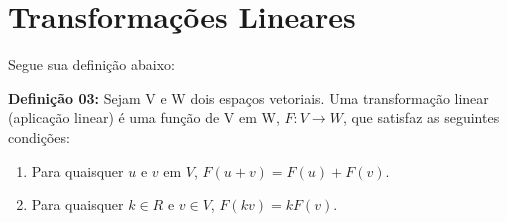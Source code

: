 \chapter{Transformações Lineares}
Segue sua definição abaixo:

\noindent\textbf{Definição 03:} Sejam V e W dois espaços vetoriais. Uma transformação linear (aplicação linear) é uma função de V em W, $F:V \rightarrow W$, que satisfaz as seguintes condições:
\begin{enumerate}
	\item Para quaisquer $u$ e $v$ em $V$, $F(u + v) = F(u) + F(v)$.
	\item Para quaisquer $k \in R$ e $v \in V$, $F(kv) = kF(v)$.
\end{enumerate}	